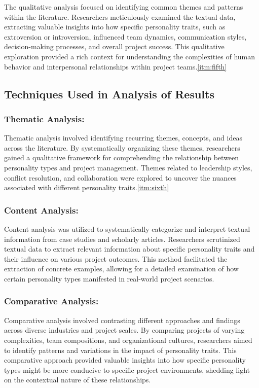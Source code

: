 \documentclass[a4Paper]{article}
\begin{document}
The qualitative analysis focused on identifying common themes and patterns within the literature. Researchers meticulously examined the textual data, extracting valuable insights into how specific personality traits, such as extroversion or introversion, influenced team dynamics, communication styles, decision-making processes, and overall project success. This qualitative exploration provided a rich context for understanding the complexities of human behavior and interpersonal relationships within project teams.\ref{itm:fifth}

\subsection{Techniques Used in Analysis of Results}

\subsubsection{Thematic Analysis: } Thematic analysis involved identifying recurring themes, concepts, and ideas across the literature. By systematically organizing these themes, researchers gained a qualitative framework for comprehending the relationship between personality types and project management. Themes related to leadership styles, conflict resolution, and collaboration were explored to uncover the nuances associated with different personality traits.\ref{itm:sixth}

\subsubsection{Content Analysis: } Content analysis was utilized to systematically categorize and interpret textual information from case studies and scholarly articles. Researchers scrutinized textual data to extract relevant information about specific personality traits and their influence on various project outcomes. This method facilitated the extraction of concrete examples, allowing for a detailed examination of how certain personality types manifested in real-world project scenarios.

\subsubsection{Comparative Analysis: } Comparative analysis involved contrasting different approaches and findings across diverse industries and project scales. By comparing projects of varying complexities, team compositions, and organizational cultures, researchers aimed to identify patterns and variations in the impact of personality traits. This comparative approach provided valuable insights into how specific personality types might be more conducive to specific project environments, shedding light on the contextual nature of these relationships.\\
\end{document}
